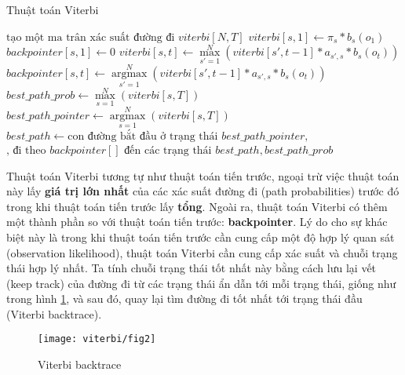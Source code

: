 \begin{breakablealgorithm}
  \caption{Thuật toán Viterbi}
  \begin{algorithmic}[1]
   \State $\text{tạo một ma trân xác suất đường đi } viterbi[N, T]$
    \State {}
        \State $viterbi[s,1] \gets \pi_s * b_s \left( {o_1} \right)$
        \State $backpointer[s, 1] \gets 0$
        \State {}
     \EndFor
        	\State $viterbi[s, t] \gets \mathop {\max }\limits_{s' = 1}^N \left( {viterbi\left[ {s',t - 1} \right]*{a_{s',s}}*{b_s}\left( {{o_t}} \right)} \right)$
        	\State $backpointer[s, t] \gets \mathop {\arg \max }\limits_{s' = 1}^N \left( {viterbi\left[ {s',t - 1} \right]*{a_{s',s}}*{b_s}\left( {{o_t}} \right)} \right)$
        \EndFor
      \EndFor
     \State {}
     \State $best\_path\_prob \gets \mathop {\max }\limits_{s = 1}^N \left( {viterbi\left[ {s,T} \right]} \right)$
     \State $best\_path\_pointer \gets \mathop {\arg \max }\limits_{s = 1}^N \left( {viterbi\left[ {s,T} \right]} \right) $
     \State $best\_path \gets \text{con đường bắt đầu ở trạng thái }  best\_path\_pointer, $
     \State $\text{, đi theo } backpointer[] \text{ đến các trạng thái}$
    \Return $best\_path, best\_path\_prob$
    \EndFunction
  \end{algorithmic}
\end{breakablealgorithm}

Thuật toán Viterbi tương tự như thuật toán tiến trước, ngoại trừ việc thuật toán này lấy \textbf{giá trị lớn nhất} của các xác suất đường đi (path probabilities) trước đó trong khi thuật toán tiến trước lấy \textbf{tổng}. Ngoài ra, thuật toán Viterbi có thêm một thành phần so với thuật toán tiến trước: \textbf{backpointer}. Lý do cho sự khác biệt này là trong khi thuật toán tiến trước cần cung cấp một độ hợp lý quan sát (observation likelihood), thuật toán Viterbi cần cung cấp xác suất và chuỗi trạng thái hợp lý nhất. Ta tính chuỗi trạng thái tốt nhất này bằng cách lưu lại vết (keep track) của đường đi từ các trạng thái ẩn dẫn tới mỗi trạng thái, giống như trong hình \ref{viterbi_fig2}, và sau đó, quay lại tìm đường đi tốt nhất tới trạng thái đầu (Viterbi backtrace).

\begin{figure}[H]
\begin{center}
\texttt{[image: viterbi/fig2]}
\end{center}
\caption{Viterbi backtrace \label{viterbi_fig2}}
\end{figure}

